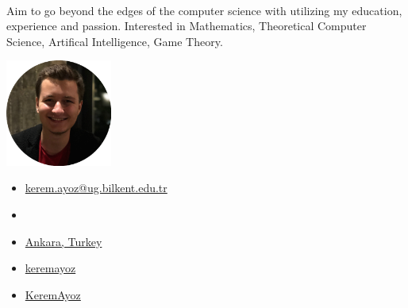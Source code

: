 \documentclass[11 pt, a4paper, usenames, dvipsnames]{article}
\date{}
\newcommand*{\SubFont}{%
      \fontsize{15}{8}%
\color{Gray}
      \selectfont}
\newcommand*{\TitleFont}{%
      \fontsize{24}{10}%
\color{BrickRed}
      \selectfont}
\newcommand*{\ProfileFont}{%
      \fontsize{10}{2}%
\color{Black}
      \selectfont}
\begin{document}
\begin{paracol}{3} 
\begin{flushleft}
{\textbf{\TitleFont{KEREM AY\"{O}Z}}} \vspace{-0.4em}
\end{flushleft}
{\SubFont{Computer Scientist}}\vspace{0.7em} \\ 
{\ProfileFont Aim to go beyond the edges of the computer science with utilizing my education, experience and passion. Interested in Mathematics, Theoretical Computer Science, Artifical Intelligence,  Game Theory.}
  \switchcolumn[1]
\begin {center}
\centering\includegraphics[width=3.5cm, height=3.5cm]{photo.png}
\end{center}
  \switchcolumn[2]
 \begin{itemize}
\item[] \hfill\ProfileFont \href{mailto:kerem.ayoz@ug.bilkent.edu.tr}{kerem.ayoz@ug.bilkent.edu.tr} \enskip\color{BrickRed} \verb||\faEnvelopeO 
\item[]\hfill \ProfileFont {+905078763048} \enskip\color{BrickRed} \verb||\faPhone
\item[] \hfill \ProfileFont\href{https://www.google.com/maps/@39.8696765,32.7465477,17z}{Ankara, Turkey} \enskip\color{BrickRed} \verb||\faLocationArrow
\item[] \hfill\ProfileFont\href{https://www.linkedin.com/in/keremayoz/}{keremayoz} \enskip \color{BrickRed}\verb||\faLinkedin
\item[]\hfill \ProfileFont\href{https://github.com/KeremAyoz} {KeremAyoz} \enskip\color{BrickRed} \verb||\faGithub
\end{itemize} 
\end{paracol}
\end{document}
